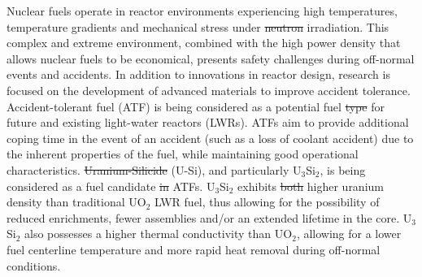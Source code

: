 \documentclass[review]{elsarticle}
\providecommand{\DIFaddtex}[1]{{\protect\color{blue}\uwave{#1}}} %
\providecommand{\DIFdeltex}[1]{{\protect\color{red}\sout{#1}}}                      %
\providecommand{\DIFaddbegin}{} %
\providecommand{\DIFaddend}{} %
\providecommand{\DIFdelbegin}{} %
\providecommand{\DIFdelend}{} %
\providecommand{\DIFadd}[1]{\texorpdfstring{\DIFaddtex{#1}}{#1}} %
\providecommand{\DIFdel}[1]{\texorpdfstring{\DIFdeltex{#1}}{}} %
\newcommand{\DIFscaledelfig}{0.5}
\newlength{\DIFdelgraphicswidth} %
\newlength{\DIFdelgraphicsheight} %
\newcommand{\DIFaddincludegraphics}[2][]{{\color{blue}\fbox{\DIFOincludegraphics[#1]{#2}}}} %
\newcommand{\DIFdelincludegraphics}[2][]{%
\sbox{\DIFdelgraphicsbox}{\DIFOincludegraphics[#1]{#2}}%
\settoboxwidth{\DIFdelgraphicswidth}{\DIFdelgraphicsbox} %
\settoboxtotalheight{\DIFdelgraphicsheight}{\DIFdelgraphicsbox} %
\scalebox{\DIFscaledelfig}{%
\parbox[b]{\DIFdelgraphicswidth}{\usebox{\DIFdelgraphicsbox}\\[-\baselineskip] \rule{\DIFdelgraphicswidth}{0em}}\llap{\resizebox{\DIFdelgraphicswidth}{\DIFdelgraphicsheight}{%
\setlength{\unitlength}{\DIFdelgraphicswidth}%
\begin{picture}(1,1)%
\thicklines\linethickness{2pt} %
{\color[rgb]{1,0,0}\put(0,0){\framebox(1,1){}}}%
{\color[rgb]{1,0,0}\put(0,0){\line( 1,1){1}}}%
{\color[rgb]{1,0,0}\put(0,1){\line(1,-1){1}}}%
\end{picture}%
}\hspace*{3pt}}} %
} %
\DeclareRobustCommand{\DIFaddbegin}{\DIFOaddbegin \let\includegraphics\DIFaddincludegraphics} %
\DeclareRobustCommand{\DIFaddend}{\DIFOaddend \let\includegraphics\DIFOincludegraphics} %
\DeclareRobustCommand{\DIFdelbegin}{\DIFOdelbegin \let\includegraphics\DIFdelincludegraphics} %
\DeclareRobustCommand{\DIFdelend}{\DIFOaddend \let\includegraphics\DIFOincludegraphics} %
\begin{document}
Nuclear fuels operate in reactor environments experiencing high temperatures, temperature gradients and mechanical stress under \DIFdelbegin \DIFdel{neutron }\DIFdelend irradiation.  This complex and extreme environment, combined with the high power density that allows nuclear fuels to be economical, presents safety challenges during off-normal events and accidents.  In addition to innovations in reactor design, research is focused on the development of advanced materials \cite{zinkle2016} to improve accident tolerance.  Accident-tolerant fuel (ATF) \cite{zinkle2014} is being considered as a potential fuel \DIFdelbegin \DIFdel{type }\DIFdelend for future and existing light-water reactors (LWRs).  ATFs aim to provide additional coping time in the event of an accident (such as a loss of coolant accident) due to the inherent properties of the fuel, while maintaining good operational characteristics.  \DIFdelbegin \DIFdel{Uranium-Silicide }\DIFdelend \DIFaddbegin \DIFadd{Uranium-silicide }\DIFaddend (U-Si), and particularly U$_{3}$Si$_{2}$, is being considered as a fuel candidate \DIFdelbegin \DIFdel{in }\DIFdelend \DIFaddbegin \DIFadd{for }\DIFaddend ATFs.  U$_{3}$Si$_{2}$ exhibits \DIFdelbegin \DIFdel{both }\DIFdelend higher uranium density than traditional UO$_{2}$ LWR fuel, thus allowing for the possibility of reduced enrichments, fewer assemblies and/or an extended lifetime in the core.  U$_{3}$Si$_{2}$ also possesses a higher thermal conductivity than UO$_{2}$, allowing for a lower fuel centerline temperature and more rapid heat removal during off-normal conditions.  
\end{document}
